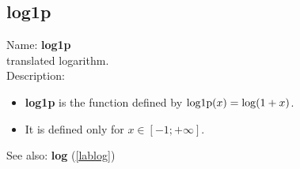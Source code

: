 \subsection{log1p}
\label{lablog1p}
\noindent Name: \textbf{log1p}\\
translated logarithm.\\
\noindent Description: \begin{itemize}

\item \textbf{log1p} is the function defined by ${\rm log1p}(x) = \log(1+x)$.

\item It is defined only for $x \in [-1; +\infty]$.
\end{itemize}
See also: \textbf{log} (\ref{lablog})
